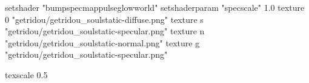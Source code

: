 setshader "bumpspecmappulseglowworld"
setshaderparam "specscale" 1.0
texture 0 "getridou/getridou_soulstatic-diffuse.png"
texture s "getridou/getridou_soulstatic-specular.png"
texture n "getridou/getridou_soulstatic-normal.png"
texture g "getridou/getridou_soulstatic-specular.png"

texscale 0.5
